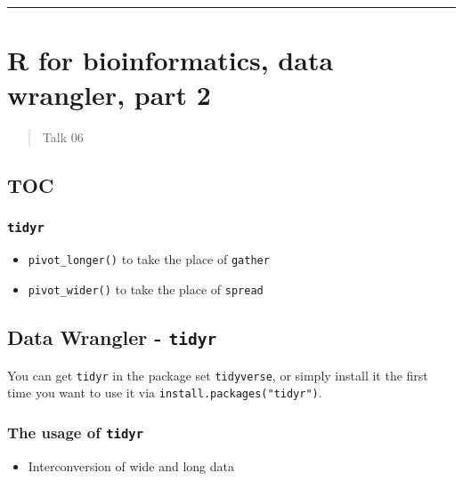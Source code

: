 \documentclass[
]{article}
\begin{document}
\begin{center}\rule{0.5\linewidth}{0.5pt}\end{center}

\hypertarget{r-for-bioinformatics-data-wrangler-part-2}{%
\section{R for bioinformatics, data wrangler, part
2}\label{r-for-bioinformatics-data-wrangler-part-2}}

\begin{quote}
Talk 06
\end{quote}

\hypertarget{toc-2}{%
\subsection{TOC}\label{toc-2}}

\hypertarget{tidyr}{%
\subsubsection{\texorpdfstring{\texttt{tidyr}}{tidyr}}\label{tidyr}}

\begin{itemize}
\item
  \texttt{pivot\_longer()} to take the place of \texttt{gather}
\item
  \texttt{pivot\_wider()} to take the place of \texttt{spread}
\end{itemize}

\hypertarget{data-wrangler---tidyr}{%
\subsection{\texorpdfstring{Data Wrangler -
\texttt{tidyr}}{Data Wrangler - tidyr}}\label{data-wrangler---tidyr}}

You can get \texttt{tidyr} in the package set \texttt{tidyverse}, or
simply install it the first time you want to use it via
\texttt{install.packages("tidyr")}.

\hypertarget{the-usage-of-tidyr}{%
\subsubsection{\texorpdfstring{The usage of
\texttt{tidyr}}{The usage of tidyr}}\label{the-usage-of-tidyr}}

\begin{itemize}
\item
  Interconversion of wide and long data
\end{itemize}
\end{document}
